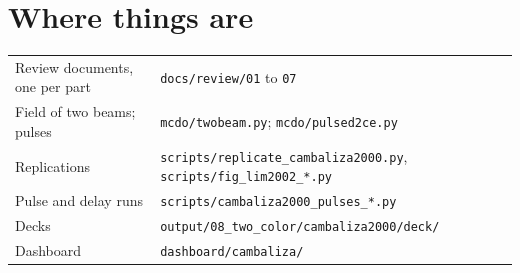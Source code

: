 \documentclass[10pt]{article}
\begin{document}
\section*{Where things are}
\begin{center}\small\begin{tabular}{ll}\toprule
Review documents, one per part & \texttt{docs/review/01} to \texttt{07}\\
Field of two beams; pulses & \texttt{mcdo/twobeam.py}; \texttt{mcdo/pulsed2ce.py}\\
Replications & \texttt{scripts/replicate\_cambaliza2000.py}, \texttt{scripts/fig\_lim2002\_*.py}\\
Pulse and delay runs & \texttt{scripts/cambaliza2000\_pulses\_*.py}\\
Decks & \texttt{output/08\_two\_color/cambaliza2000/deck/}\\
Dashboard & \texttt{dashboard/cambaliza/}\\\bottomrule\end{tabular}\end{center}
\end{document}
